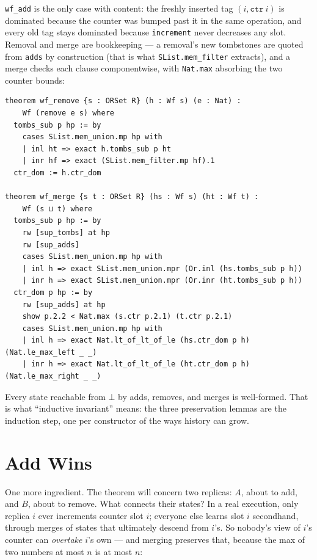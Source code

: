 \documentclass[12pt, a4paper, openright]{book}
\theoremstyle{thmstyle}
\theoremstyle{defstyle}
\newcommand{\lc}[1]{\texttt{#1}}
\newcommand{\lean}[1]{\texttt{#1}}
\begin{document}
\lc{wf_add} is the only case with content: the freshly inserted tag
$(i, \lean{ctr}\ i)$ is dominated because the counter was bumped past it
in the same operation, and every old tag stays dominated because
\lc{increment} never decreases any slot. Removal and merge are
bookkeeping --- a removal's new tombstones are quoted from \lc{adds} by
construction (that is what \lc{SList.mem_filter} extracts), and a merge
checks each clause componentwise, with \lc{Nat.max} absorbing the two
counter bounds:

\begin{verbatim}
theorem wf_remove {s : ORSet R} (h : Wf s) (e : Nat) :
    Wf (remove e s) where
  tombs_sub p hp := by
    cases SList.mem_union.mp hp with
    | inl ht => exact h.tombs_sub p ht
    | inr hf => exact (SList.mem_filter.mp hf).1
  ctr_dom := h.ctr_dom

theorem wf_merge {s t : ORSet R} (hs : Wf s) (ht : Wf t) :
    Wf (s ⊔ t) where
  tombs_sub p hp := by
    rw [sup_tombs] at hp
    rw [sup_adds]
    cases SList.mem_union.mp hp with
    | inl h => exact SList.mem_union.mpr (Or.inl (hs.tombs_sub p h))
    | inr h => exact SList.mem_union.mpr (Or.inr (ht.tombs_sub p h))
  ctr_dom p hp := by
    rw [sup_adds] at hp
    show p.2.2 < Nat.max (s.ctr p.2.1) (t.ctr p.2.1)
    cases SList.mem_union.mp hp with
    | inl h => exact Nat.lt_of_lt_of_le (hs.ctr_dom p h) (Nat.le_max_left _ _)
    | inr h => exact Nat.lt_of_lt_of_le (ht.ctr_dom p h) (Nat.le_max_right _ _)
\end{verbatim}

Every state reachable from $\bot$ by adds, removes, and merges is
well-formed. That is what ``inductive invariant'' means: the three
preservation lemmas are the induction step, one per constructor of the
ways history can grow.

\section{Add Wins}
\label{sec:addwins}

One more ingredient. The theorem will concern two replicas: $A$, about
to add, and $B$, about to remove. What connects their states? In a real
execution, only replica $i$ ever increments counter slot $i$; everyone
else learns slot $i$ secondhand, through merges of states that
ultimately descend from $i$'s. So nobody's view of $i$'s counter can
\emph{overtake} $i$'s own --- and merging preserves that, because the max
of two numbers at most $n$ is at most $n$:
\end{document}
